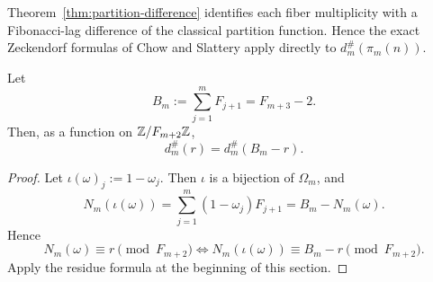 \begin{remark}
\label{rem:single-fiber-literature}
Theorem~\ref{thm:partition-difference} identifies each fiber multiplicity with
a Fibonacci-lag difference of the classical partition function.  Hence the
exact Zeckendorf formulas of Chow and Slattery \cite{ChowSlattery2021} apply
directly to \(d_m^\#(\pi_m(n))\).
\end{remark}

\begin{proposition}
\label{prop:complement-symmetry}
Let
\[
  B_m:=\sum_{j=1}^mF_{j+1}=F_{m+3}-2.
\]
Then, as a function on \(\mathbb{Z}/F_{m+2}\mathbb{Z}\),
\[
  d_m^\#(r)=d_m^\#(B_m-r).
\]
\end{proposition}

\begin{proof}
Let \(\iota(\omega)_j:=1-\omega_j\).  Then \(\iota\) is a bijection of
\(\Omega_m\), and
\[
  N_m(\iota(\omega))
  =
  \sum_{j=1}^m (1-\omega_j)F_{j+1}
  =
  B_m-N_m(\omega).
\]
Hence
\[
  N_m(\omega)\equiv r \pmod{F_{m+2}}
  \iff
  N_m(\iota(\omega))\equiv B_m-r \pmod{F_{m+2}}.
\]
Apply the residue formula at the beginning of this section.
\end{proof}
